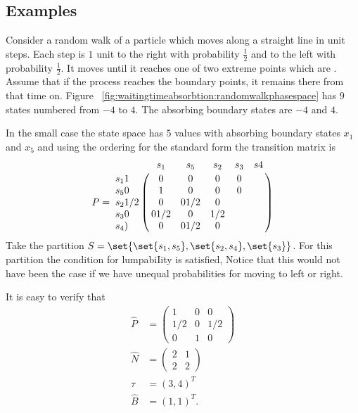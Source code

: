 \documentclass[12pt]{article}
\begin{document}
\subsection*{Examples}

\begin{example}
    Consider a random walk%
    of a particle which moves along a straight line in unit steps.  Each
    step is \( 1 \) unit to the right with probability \( \frac{1}{2} \) and to
    the left with probability \( \frac{1}{2} \).  It moves until it reaches
    one of two extreme points which are .~%
    Assume that if the process reaches the boundary points, it remains
    there from that time on.  Figure~%
    \ref{fig:waitingtimeabsorbtion:randomwalkphasespace} has \( 9 \)
    states numbered from \( -4 \) to \( 4 \).  The absorbing boundary
    states are \( -4 \) and \( 4 \).

    In the small case the state space has $5$ values with absorbing
    boundary states $x_1$ and $x_5$ and using the ordering for the
    standard form the transition matrix is
    \[
      P =
      \bordermatrix{
       & s_1 & s_5 & s_2 & s_3 & s4 \cr
      s_1 1 & 0 & 0 & 0 & 0 \cr
      s_5 0 & 1 & 0 & 0 & 0 \cr
      s_2 1/2 & 0 & 0 1/2 & 0 \cr
      s_3 0 & 0 1/2 & 0 & 1/2 \cr
      s_4 ) & 0 & 0 1/2 & 0 \cr
    }
  \]
  Take the partition $S = \set{ \set{s_1, s_5}, \set{s_2, s_4},
    \set{s_3}}$.  For  this  partition 
the condition for lumpabiIity is  satisfied, Notice  that this would not 
have  been the case  if we  have  unequal probabilities for  moving
to left or right.

It is easy to verify that
\begin{align*}
   \hat{P} &=
   \begin{pmatrix}
     1 & 0 & 0 \\
     1/2 & 0 & 1/2 \\
     0  & 1  & 0
   \end{pmatrix} \\
  \hat{N} &=
  \begin{pmatrix}
    2 & 1 \\
    2 & 2
  \end{pmatrix} \\
  \hat{\tau} &= (3, 4)^T \\
  \hat{B} &= (1,1)^T.
\end{align*}
 


\end{example}
\end{document}
